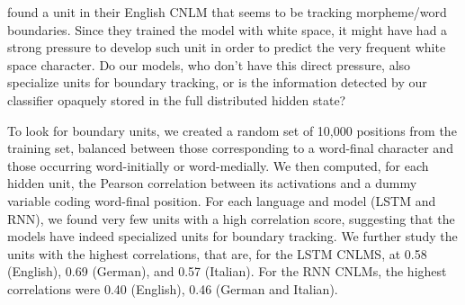 %

 found a unit in their English
CNLM that seems to be tracking morpheme/word boundaries.  Since they
trained the model with white space, it might have had a strong
pressure to develop such unit in order to predict the very frequent
white space character. Do our models, who don't have this direct
pressure, also specialize units for boundary tracking, or is the
information detected by our classifier opaquely stored in the
full distributed hidden state?

To look for boundary units, we created a random set of 10,000
positions from the training set, balanced between those corresponding
to a word-final character and those occurring word-initially or
word-medially.  We then computed, for each hidden unit, the Pearson
correlation between its activations and a dummy variable coding
word-final position. For each language and model (LSTM and RNN), we
found very few units with a high correlation score, suggesting that
the models have indeed specialized units for boundary tracking. We
further study the units with the highest correlations, that are, for
the LSTM CNLMS, at 0.58 (English), 0.69 (German), and 0.57 (Italian).
For the RNN CNLMs, the highest correlations were 0.40 (English), 0.46
(German and Italian).

